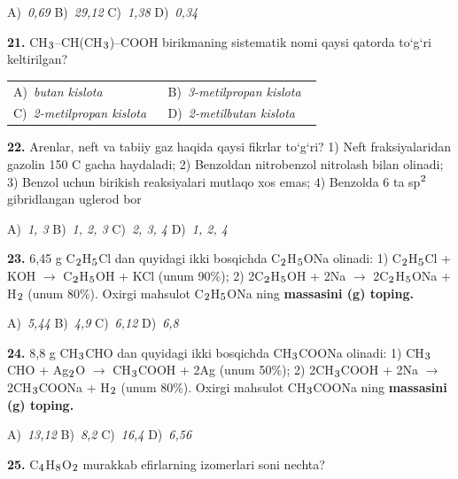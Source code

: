 \documentclass[11pt,a4paper]{article}
\renewcommand{\textsubscript}[1]{\ensuremath{_{\text{\fontsize{8}{8}\selectfont #1}}}}
\renewcommand{\textsuperscript}[1]{\ensuremath{^{\text{\fontsize{8}{8}\selectfont #1}}}}
\begin{document}
\begin{multicols}{2}
\noindent A)~\textsl{0,69} \hfill B)~\textsl{29,12} \hfill C)~\textsl{1,38} \hfill D)~\textsl{0,34}\par
\vspace{4pt}
\noindent\textbf{21.} CH\textsubscript{3}--CH(CH\textsubscript{3})--COOH birikmaning sistematik nomi qaysi qatorda to`g`ri keltirilgan?

\noindent\begin{tabular}{@{}p{0.47\linewidth}@{}p{0.47\linewidth}@{}}
A)~\textsl{butan kislota} & B)~\textsl{3-metilpropan kislota} \\
C)~\textsl{2-metilpropan kislota} & D)~\textsl{2-metilbutan kislota} \\
\end{tabular}\par
\vspace{4pt}
\noindent\textbf{22.} Arenlar, neft va tabiiy gaz haqida qaysi fikrlar to`g`ri? 1) Neft fraksiyalaridan gazolin 150 \textdegree{}C gacha haydaladi; 2) Benzoldan nitrobenzol nitrolash bilan olinadi; 3) Benzol uchun birikish reaksiyalari mutlaqo xos emas; 4) Benzolda 6 ta sp\textsuperscript{2} gibridlangan uglerod bor

\noindent A)~\textsl{1, 3} \hfill B)~\textsl{1, 2, 3} \hfill C)~\textsl{2, 3, 4} \hfill D)~\textsl{1, 2, 4}\par
\vspace{4pt}
\noindent\textbf{23.} 6,45 g C\textsubscript{2}H\textsubscript{5}Cl dan quyidagi ikki bosqichda C\textsubscript{2}H\textsubscript{5}ONa olinadi: 1) C\textsubscript{2}H\textsubscript{5}Cl + KOH $\to$ C\textsubscript{2}H\textsubscript{5}OH + KCl (unum 90\%); 2) 2C\textsubscript{2}H\textsubscript{5}OH + 2Na $\to$ 2C\textsubscript{2}H\textsubscript{5}ONa + H\textsubscript{2} (unum 80\%). Oxirgi mahsulot C\textsubscript{2}H\textsubscript{5}ONa ning \textbf{massasini (g) toping.}

\noindent A)~\textsl{5,44} \hfill B)~\textsl{4,9} \hfill C)~\textsl{6,12} \hfill D)~\textsl{6,8}\par
\vspace{4pt}
\noindent\textbf{24.} 8,8 g CH\textsubscript{3}CHO dan quyidagi ikki bosqichda CH\textsubscript{3}COONa olinadi: 1) CH\textsubscript{3}CHO + Ag\textsubscript{2}O $\to$ CH\textsubscript{3}COOH + 2Ag (unum 50\%); 2) 2CH\textsubscript{3}COOH + 2Na $\to$ 2CH\textsubscript{3}COONa + H\textsubscript{2} (unum 80\%). Oxirgi mahsulot CH\textsubscript{3}COONa ning \textbf{massasini (g) toping.}

\noindent A)~\textsl{13,12} \hfill B)~\textsl{8,2} \hfill C)~\textsl{16,4} \hfill D)~\textsl{6,56}\par
\vspace{4pt}
\noindent\textbf{25.} C\textsubscript{4}H\textsubscript{8}O\textsubscript{2} murakkab efirlarning izomerlari soni nechta?


\end{multicols}
\end{document}
